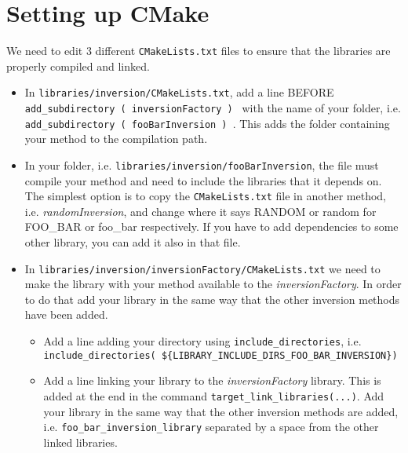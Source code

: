 \documentclass{article}
\begin{document}
\section{Setting up CMake}
We need to edit 3 different \texttt{CMakeLists.txt} files to ensure that the libraries are properly compiled and linked.
\begin{itemize}
    \item In \texttt{libraries/inversion/CMakeLists.txt}, add a line BEFORE \\\texttt{add\_subdirectory ( inversionFactory ) } with the name of your folder, i.e. \texttt{add\_subdirectory ( fooBarInversion ) }. This adds the folder containing your method to the compilation path.
    \item In your folder, i.e. \texttt{libraries/inversion/fooBarInversion}, the file must compile your method and need to include the libraries that it depends on. The simplest option is to copy the \texttt{CMakeLists.txt} file in another method, i.e. \textit{randomInversion}, and change where it says RANDOM or random for FOO\_BAR or foo\_bar respectively. If you have to add dependencies to some other library, you can add it also in that file.
    \item In \texttt{libraries/inversion/inversionFactory/CMakeLists.txt} we need to make the library with your method available to the \textit{inversionFactory}. In order to do that add your library in the same way that the other inversion methods have been added.
    \begin{itemize}
        \item Add a line adding your directory using \texttt{include\_directories}, i.e.\\\texttt{include\_directories( \$\{LIBRARY\_INCLUDE\_DIRS\_FOO\_BAR\_INVERSION\})}
        \item Add a line linking your library to the \textit{inversionFactory} library. This is added at the end in the command \texttt{target\_link\_libraries(...)}. Add your library in the same way that the other inversion methods are added, i.e. \texttt{foo\_bar\_inversion\_library} separated by a space from the other linked libraries.  
    \end{itemize}
\end{itemize}
\end{document}
